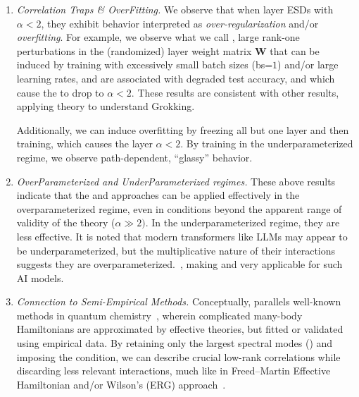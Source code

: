 \begin{enumerate}[label=\Alph*.]
\item
  \emph{Correlation Traps \& OverFitting.}
  We  observe that when layer ESDs with $\alpha<2$, they exhibit behavior interpreted as
  \emph{over-regularization} and/or  \emph{overfitting}.
  For example, we observe what we call \emph{\CorrelationTraps}, large rank-one perturbations in the
  (randomized)  layer weight matrix $\mathbf{W}$ that can be induced by training with
  excessively small batch sizes (bs=$1$) and/or large learning rates, and are associated with degraded test accuracy,
  and which cause the \HTSR to drop to $\alpha<2$.
  These results are consistent with other results, applying \HTSR theory to understand Grokking\cite{prakash2025grokking}.
  
  Additionally, we can induce overfitting by freezing all but one layer and
  then training, which causes the layer $\alpha<2$.  By training in
  the underparameterized regime, we observe path-dependent, “glassy” behavior.

\item
\emph{OverParameterized and UnderParameterized regimes.}
  These above results indicate that the \HTSR and \SETOL approaches can be applied effectively in the overparameterized regime, even in conditions beyond the apparent range of validity of the theory ($\alpha\gg 2)$.  In the underparameterized regime, they are less effective.  It is noted that modern transformers like LLMs may appear to be underparameterized, but the multiplicative nature of their interactions suggests they are overparameterized.~\cite{hay2024}, making \HTSR and \SETOL very applicable for such AI models.
  
\item 
\emph{Connection to Semi-Empirical Methods.}
Conceptually, \SETOL parallels well-known \emph{\SemiEmpirical} methods in quantum
chemistry~\cite{Martin1996, Martin1996_CPL,Martin1998}, wherein complicated many-body Hamiltonians are approximated by 
effective theories, but fitted or validated using empirical data. By retaining only the largest spectral modes 
(\ECS) and imposing the \TRACELOG condition, we can describe crucial low-rank correlations while discarding less 
relevant interactions, much like in Freed--Martin Effective Hamiltonian  and/or Wilson’s  \ExactRenormalizationGroup 
(ERG) approach~\cite{Freed1983,Martin1994,Martin1996,Martin1996_CPL,  MartinFreed1996, Martin1998, PhysRevLett.69.800}.
\end{enumerate}

